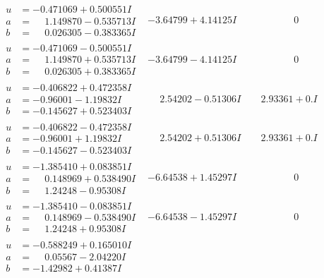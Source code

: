 \documentclass[1p]{elsarticle_modified}
\theoremstyle{definition}
\begin{document}
$$\begin{array}{c|c|c}
\begin{aligned}
u &= -0.471069 + 0.500551 I \\
a &= \phantom{-}1.149870 - 0.535713 I \\
b &= \phantom{-}0.026305 - 0.383365 I\end{aligned}
 & -3.64799 + 4.14125 I & \phantom{-0.000000 } 0 \\ \hline\begin{aligned}
u &= -0.471069 - 0.500551 I \\
a &= \phantom{-}1.149870 + 0.535713 I \\
b &= \phantom{-}0.026305 + 0.383365 I\end{aligned}
 & -3.64799 - 4.14125 I & \phantom{-0.000000 } 0 \\ \hline\begin{aligned}
u &= -0.406822 + 0.472358 I \\
a &= -0.96001 - 1.19832 I \\
b &= -0.145627 + 0.523403 I\end{aligned}
 & \phantom{-}2.54202 - 0.51306 I & \phantom{-}2.93361 + 0. I\phantom{ +0.000000I} \\ \hline\begin{aligned}
u &= -0.406822 - 0.472358 I \\
a &= -0.96001 + 1.19832 I \\
b &= -0.145627 - 0.523403 I\end{aligned}
 & \phantom{-}2.54202 + 0.51306 I & \phantom{-}2.93361 + 0. I\phantom{ +0.000000I} \\ \hline\begin{aligned}
u &= -1.385410 + 0.083851 I \\
a &= \phantom{-}0.148969 + 0.538490 I \\
b &= \phantom{-}1.24248 - 0.95308 I\end{aligned}
 & -6.64538 + 1.45297 I & \phantom{-0.000000 } 0 \\ \hline\begin{aligned}
u &= -1.385410 - 0.083851 I \\
a &= \phantom{-}0.148969 - 0.538490 I \\
b &= \phantom{-}1.24248 + 0.95308 I\end{aligned}
 & -6.64538 - 1.45297 I & \phantom{-0.000000 } 0 \\ \hline\begin{aligned}
u &= -0.588249 + 0.165010 I \\
a &= \phantom{-}0.05567 - 2.04220 I \\
b &= -1.42982 + 0.41387 I\end{aligned}

\end{array}$$
\end{document}
